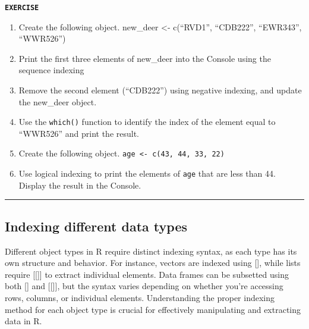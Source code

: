 \documentclass[
]{book}
\providecommand{\tightlist}{%
  \setlength{\itemsep}{0pt}\setlength{\parskip}{0pt}}
\begin{document}
\textbf{\texttt{EXERCISE}}

\begin{enumerate}
\def\labelenumi{\arabic{enumi}.}
\tightlist
\item
  Create the following object. new\_deer \textless- c(``RVD1'', ``CDB222'', ``EWR343'', ``WWR526'')
\item
  Print the first three elements of new\_deer into the Console using the sequence indexing
\item
  Remove the second element (``CDB222'') using negative indexing, and update the new\_deer object.
\item
  Use the \texttt{which()} function to identify the index of the element equal to ``WWR526'' and print the result.
\item
  Create the following object. \texttt{age\ \textless{}-\ c(43,\ 44,\ 33,\ 22)}
\item
  Use logical indexing to print the elements of \texttt{age} that are less than 44. Display the result in the Console.
\end{enumerate}

\begin{center}\rule{0.5\linewidth}{0.5pt}\end{center}

\subsection{Indexing different data types}\label{indexing-different-data-types}

Different object types in R require distinct indexing syntax, as each type has its own structure and behavior. For instance, vectors are indexed using {[}{]}, while lists require {[}{[}{]}{]} to extract individual elements. Data frames can be subsetted using both {[}{]} and {[}{[}{]}{]}, but the syntax varies depending on whether you're accessing rows, columns, or individual elements. Understanding the proper indexing method for each object type is crucial for effectively manipulating and extracting data in R.
\end{document}
